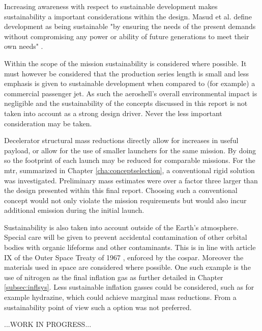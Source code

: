 Increasing awareness with respect to sustainable development makes sustainability a important considerations within the design. Masud et al. define development as being sustainable "by ensuring the needs of the present demands without compromising any power or ability of future generations to meet their own needs" \cite[p.85]{Masud2011}. 

Within the scope of the mission sustainability is considered where possible. It must however be considered that the production series length is small and less emphasis is given to sustainable development when compared to (for example) a commercial passenger jet. As such the aeroshell's overall environmental impact is negligible and the sustainability of the concepts discussed in this report is not taken into account as a strong design driver. Never the less important consideration may be taken. 

Decelerator structural mass reductions directly allow for increases in useful payload, or allow for the use of smaller launchers for the same mission. By doing so the footprint of each launch may be reduced for comparable missions. For the \gls{mtr}, summarized in Chapter \ref{cha:conceptselection},  a conventional rigid solution was investigated. Preliminary mass estimates were over a factor three larger than the design presented within this final report. Choosing such a conventional concept would not only violate the mission requirements but would also incur additional emission during the initial launch.

Sustainability is also taken into account outside of the Earth's atmosphere. Special care will be given to prevent accidental contamination of other orbital bodies with organic lifeforms and other contaminants. This is in line with article IX of the Outer Space Treaty of 1967 \cite{UnitedNations2008}, enforced by the \acrfull{cospar}. Moreover the materials used in space are considered where possible. One such example is the use of nitrogen as the final inflation gas as further detailed in Chapter \ref{subsec:inflsys}. Less sustainable inflation gasses could be considered, such as for example hydrazine, which could achieve marginal mass reductions. From a sustainability point of view such a option was not preferred.




 ...WORK IN PROGRESS...



